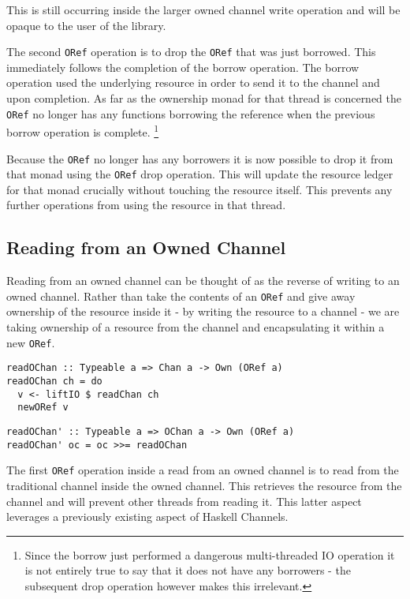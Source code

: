 \documentclass[onehalf,11pt]{beavtex}
\begin{document}
This is still occurring inside the larger owned channel write operation and will
be opaque to the user of the library.

The second \texttt{ORef} operation is to drop the \texttt{ORef} that was just
borrowed. This immediately follows the completion of the borrow operation. The
borrow operation used the underlying resource in order to send it to the channel
and upon completion. As far as the ownership monad for that thread is
concerned the \texttt{ORef} no longer has any functions borrowing the reference
when the previous borrow operation is complete.
\footnote{Since the borrow just performed a dangerous multi-threaded IO operation
  it is not entirely true to say that it does not have any borrowers - the
  subsequent drop operation however makes this irrelevant.}

Because the \texttt{ORef} no longer has any borrowers it is now possible to
drop it from that monad using the \texttt{ORef} drop operation.  This will
update the resource ledger for that monad crucially without touching the
resource itself.
This prevents any further operations from using the resource
in that thread.

\subsection{Reading from an Owned Channel}

Reading from an owned channel can be thought of as the reverse of
writing to an owned channel.  Rather than take the contents of an
\texttt{ORef} and give away ownership of the resource inside it - by writing the
resource to a channel - we are taking ownership of a resource from the channel
and encapsulating it within a new \texttt{ORef}.

\begin{verbatim}
readOChan :: Typeable a => Chan a -> Own (ORef a)
readOChan ch = do
  v <- liftIO $ readChan ch
  newORef v
\end{verbatim}

\begin{verbatim}
readOChan' :: Typeable a => OChan a -> Own (ORef a)
readOChan' oc = oc >>= readOChan
\end{verbatim}

The first \texttt{ORef} operation inside a read from an owned channel
is to read from the traditional channel inside the owned channel. This
retrieves the resource from the channel and will prevent other threads from
reading it. This latter aspect leverages a previously existing aspect of
Haskell Channels. %
\end{document}
